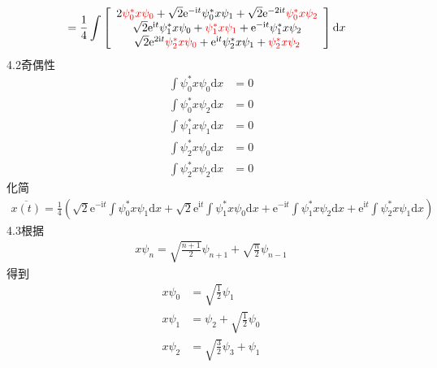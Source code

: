 \begin{equation}
\begin{aligned}
\\
&=\frac{1}{4}\int{\left[ \begin{array}{c}
	2{\color[RGB]{240, 0, 0} \psi _{0}^{*}x\psi _0}+\sqrt{2}\mathrm{e}^{-\mathrm{i}t}\psi _{0}^{*}x\psi _1+\sqrt{2}\mathrm{e}^{-2\mathrm{i}t}{\color[RGB]{240, 0, 0} \psi _{0}^{*}x\psi _2}\\
	\sqrt{2}\mathrm{e}^{\mathrm{i}t}\psi _{1}^{*}x\psi _0+{\color[RGB]{240, 0, 0} \psi _{1}^{*}x\psi _1}+\mathrm{e}^{-\mathrm{i}t}\psi _{1}^{*}x\psi _2\\
	\sqrt{2}\mathrm{e}^{2\mathrm{i}t}{\color[RGB]{240, 0, 0} \psi _{2}^{*}x\psi _0}+\mathrm{e}^{\mathrm{i}t}\psi _{2}^{*}x\psi _1+{\color[RGB]{240, 0, 0} \psi _{2}^{*}x\psi _2}\\
\end{array} \right] \mathrm{d}x}
    \end{aligned}
\end{equation}
4.2奇偶性
\begin{equation}
    \begin{aligned}
        \int{\psi _{0}^{*}x\psi _0\mathrm{d}x}&=0
\\
\int{\psi _{0}^{*}x\psi _2\mathrm{d}x}&=0
\\
\int{\psi _{1}^{*}x\psi _1\mathrm{d}x}&=0
\\
\int{\psi _{2}^{*}x\psi _0\mathrm{d}x}&=0
\\
\int{\psi _{2}^{*}x\psi _2\mathrm{d}x}&=0
    \end{aligned}
\end{equation}
化简
\begin{equation}
    \begin{aligned}
        \overline{x(t)}=\frac{1}{4}\left( \sqrt{2}\mathrm{e}^{-\mathrm{i}t}\int{\psi _{0}^{*}x\psi _1\mathrm{d}x}+\sqrt{2}\mathrm{e}^{\mathrm{i}t}\int{\psi _{1}^{*}x\psi _0\mathrm{d}x}+\mathrm{e}^{-\mathrm{i}t}\int{\psi _{1}^{*}x\psi _2\mathrm{d}x}+\mathrm{e}^{\mathrm{i}t}\int{\psi _{2}^{*}x\psi _1\mathrm{d}x} \right) 
    \end{aligned}
\end{equation}
4.3根据
\begin{equation}
    \begin{aligned}
        x\psi _n=\sqrt{\frac{n+1}{2}}\psi _{n+1}+\sqrt{\frac{n}{2}}\psi _{n-1}
    \end{aligned}
\end{equation}
得到
\begin{equation}
    \begin{aligned}
        x\psi _0&=\sqrt{\frac{1}{2}}\psi _1
\\
x\psi _1&=\psi _2+\sqrt{\frac{1}{2}}\psi _0
\\
x\psi _2&=\sqrt{\frac{3}{2}}\psi _3+\psi _1
    \end{aligned}
\end{equation}


